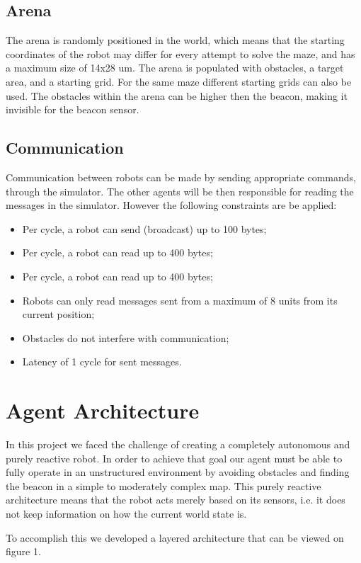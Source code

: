 \documentclass[oribibl]{llncs}
\begin{document}
\subsection{Arena}
The arena is randomly positioned in the world, which means that the starting coordinates of the robot may differ for every attempt to solve the maze, and has a maximum size of 14x28 um.
The arena is populated with obstacles, a target area, and a starting grid. For the same maze different starting grids can also be used. The obstacles within the arena can be higher then the beacon, making it invisible for the beacon sensor.

\subsection{Communication}
Communication between robots can be made by sending appropriate commands, through the simulator. The other agents will be then responsible for reading the messages in the simulator. However the following constraints are be applied:
\begin{itemize}
 \item Per cycle, a robot can send (broadcast) up to 100 bytes;
 \item Per cycle, a robot can read up to 400 bytes;
 \item Per cycle, a robot can read up to 400 bytes;
 \item Robots can only read messages sent from a maximum of 8 units from its current position;
 \item Obstacles do not interfere with communication;
 \item Latency of 1 cycle for sent messages.
 \end{itemize} 


\section{Agent Architecture}
In this project we faced the challenge of creating a completely autonomous and purely reactive robot. In order to achieve that goal our agent must be able to fully operate in an unstructured environment by avoiding obstacles and finding the beacon in a simple to moderately complex map.
This purely reactive architecture means that the robot acts merely based on its sensors, i.e. it does not keep information on how the current world state is.

To accomplish this we developed a layered architecture that can be viewed on figure 1.
\end{document}
